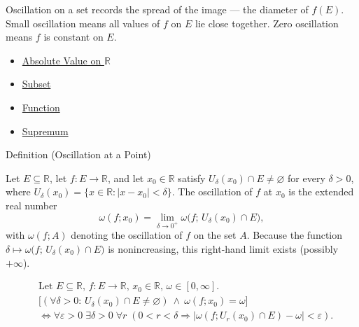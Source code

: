 \begin{remark*}[Interpretation]
Oscillation on a set records the spread of the image --- the diameter
of $f(E)$. Small oscillation means all values of $f$ on $E$ lie
close together. Zero oscillation means $f$ is constant on $E$.
\end{remark*}

\begin{dependencies}
\begin{itemize}
  \item \hyperref[def:real-chapter-absolute-value-on-r]{Absolute Value on $\mathbb{R}$}
  \item \hyperref[def:subset]{Subset}
  \item \hyperref[def:function]{Function}
  \item \hyperref[def:supremum]{Supremum}
\end{itemize}
\end{dependencies}

\begin{definitionbox}{Definition (Oscillation at a Point)}
\begin{definition}
\label{def:oscillation-at-a-point}
Let $E \subseteq \mathbb{R}$, let $f:E \to \mathbb{R}$, and let $x_0 \in \mathbb{R}$ satisfy $U_\delta(x_0)\cap E \neq \varnothing$ for every $\delta>0$, where $U_\delta(x_0)=\{x \in \mathbb{R}: |x-x_0|<\delta\}$. The oscillation of $f$ at $x_0$ is the extended real number
\[
\omega(f;x_0)
=
\lim_{\delta \to 0^+}
\omega\bigl(f;\,U_\delta(x_0)\cap E\bigr),
\]
with $\omega(f;A)$ denoting the oscillation of $f$ on the set $A$. Because the function $\delta \mapsto \omega\bigl(f;\,U_\delta(x_0)\cap E\bigr)$ is nonincreasing, this right-hand limit exists (possibly $+\infty$).
\end{definition}
\end{definitionbox}

\begin{remark*}
\[
\begin{aligned}
&\text{Let } E \subseteq \mathbb{R},\, f:E \to \mathbb{R},\, x_0 \in \mathbb{R},\, \omega \in [0,\infty].\\
&\bigl[(\forall \delta>0:\, U_\delta(x_0)\cap E \neq \varnothing)\ \land\ \omega(f;x_0)=\omega\bigr]\\
&\Longleftrightarrow
\forall \varepsilon>0\; \exists \delta>0\; \forall r\;(0<r<\delta \Rightarrow |\omega(f;U_r(x_0)\cap E)-\omega|<\varepsilon).
\end{aligned}
\]
\end{remark*}


